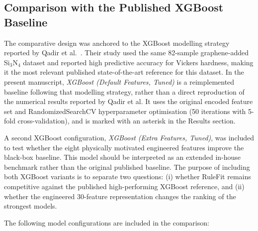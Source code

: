 \documentclass[pdflatex,sn-mathphys-num]{sn-jnl}%
\theoremstyle{thmstyleone}%
\theoremstyle{thmstyletwo}%
\theoremstyle{thmstylethree}%
\begin{document}
 






\subsection{Comparison with the Published XGBoost Baseline}
\label{sec:method_comparison}

The comparative design was anchored to the XGBoost modelling strategy reported by Qadir et al.~\cite{qadir2024predicting}. Their study used the same 82-sample graphene-added Si$_3$N$_4$ dataset and reported high predictive accuracy for Vickers hardness, making it the most relevant published state-of-the-art reference for this dataset. In the present manuscript, \textit{XGBoost (Default Features, Tuned)} is a reimplemented baseline following that modelling strategy, rather than a direct reproduction of the numerical results reported by Qadir et al. It uses the original encoded feature set and RandomizedSearchCV hyperparameter optimisation (50 iterations with 5-fold cross-validation), and is marked with an asterisk in the Results section.

A second XGBoost configuration, \textit{XGBoost (Extra Features, Tuned)}, was included to test whether the eight physically motivated engineered features improve the black-box baseline. This model should be interpreted as an extended in-house benchmark rather than the original published baseline. The purpose of including both XGBoost variants is to separate two questions: (i) whether RuleFit remains competitive against the published high-performing XGBoost reference, and (ii) whether the engineered 30-feature representation changes the ranking of the strongest models.

The following model configurations are included in the comparison:
\end{document}
